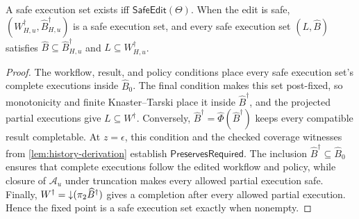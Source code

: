 \begin{lemma}
\label{lem:largest-safe-family}
A safe execution set exists iff \(\mathsf{SafeEdit}(\Theta)\).
When the edit is safe, \((W^\dagger_{H,u},\widehat B^\dagger_{H,u})\) is a safe execution set, and every safe execution set \((L,\widehat B)\) satisfies \(\widehat B\subseteq\widehat B^\dagger_{H,u}\) and \(L\subseteq W^\dagger_{H,u}\).
\end{lemma}
\begin{proof}
The workflow, result, and policy conditions place every safe execution set's complete executions inside \(\widehat B_0\).
The final condition makes this set post-fixed, so monotonicity and finite Knaster--Tarski place it inside \(\widehat B^\dagger\), and the projected partial executions give \(L\subseteq W^\dagger\).
Conversely, \(\widehat B^\dagger=\widehat\Phi(\widehat B^\dagger)\) keeps every compatible result completable.
At \(z=\epsilon\), this condition and the checked coverage witnesses from \cref{lem:history-derivation} establish \(\mathsf{PreservesRequired}\).
The inclusion \(\widehat B^\dagger\subseteq\widehat B_0\) ensures that complete executions follow the edited workflow and policy, while closure of \(\mathcal A_u\) under truncation makes every allowed partial execution safe.
Finally, \(W^\dagger=\mathord{\downarrow}(\pi_2\widehat B^\dagger)\) gives a completion after every allowed partial execution.
Hence the fixed point is a safe execution set exactly when nonempty.
\end{proof}

